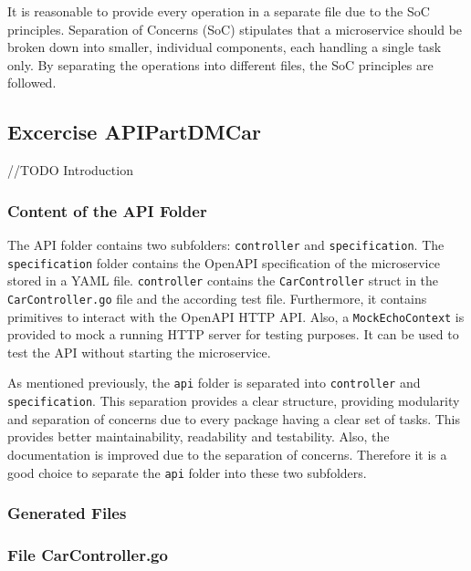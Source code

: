 It is reasonable to provide every operation in a separate file due to the SoC principles.
Separation of Concerns (SoC) stipulates that a microservice should be broken down into smaller, individual components, each handling a single task only.
By separating the operations into different files, the SoC principles are followed.
\subsection{Excercise APIPartDMCar}
//TODO Introduction
\subsubsection*{Content of the API Folder}
The API folder contains two subfolders: \texttt{controller} and \texttt{specification}. \linebreak
The \texttt{specification} folder contains the OpenAPI specification of the microservice stored in a YAML file.
\texttt{controller} contains the \texttt{CarController} struct in the \texttt{CarController.go} file and the according test file.
Furthermore, it contains primitives to interact with the OpenAPI HTTP API.
Also, a \texttt{MockEchoContext} is provided to mock a running HTTP server for testing purposes.
It can be used to test the API without starting the microservice.

As mentioned previously, the \texttt{api} folder is separated into \texttt{controller} and \texttt{specification}.
This separation provides a clear structure, providing modularity and separation of concerns due to every package having a clear set of tasks.
This provides better maintainability, readability and testability.
Also, the documentation is improved due to the separation of concerns.
Therefore it is a good choice to separate the \texttt{api} folder into these two subfolders.
\subsubsection*{Generated Files}


\subsubsection*{File CarController.go}
